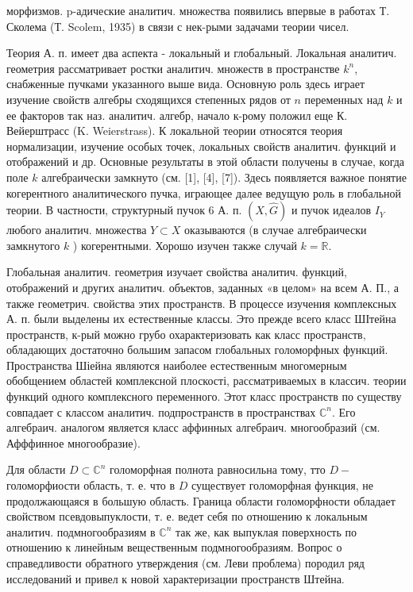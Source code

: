 \documentclass[10pt]{article}
\begin{document}
морфизмов. p-адические аналитич. множества появились впервые в работах Т. Сколема (Т. Scolem, 1935) в связи с нек-рыми задачами теории чисел.



Теория А. п. имеет два аспекта - локальный и глобальный. Локальная аналитич. геометрия рассматривает ростки аналитич. множеств в пространстве $k^{n}$, снабженные пучками указанного выше вида. Основную роль здесь играет изучение свойств алгебры сходящихся степенных рядов от $n$ переменных над $k$ и ее факторов так наз. аналитич. алгебр, начало к-рому положил еще К. Вейерштрасс (K. Weierstrass). К локальной теории относятся теория нормализации, изучение особых точек, локальных свойств аналитич. функций и отображений и др. Основные результаты в этой области получены в случае, когда поле $k$ алгебраически замкнуто (см. [1], [4], [7]). Здесь появляется важное понятие когерентного аналитического пучка, играющее далее ведущую роль в глобальной теории. В частности, структурный пучок 6 А. п. $(X, \widehat{G})$ и пучок идеалов $I_{Y}$ любого аналитич. множества $Y \subset X$ оказываются (в случае алгебраически замкнутого $k$ ) когерентными. Хорошо изучен также случай $k=\mathbb{R}$.



Глобальная аналитич. геометрия изучает свойства аналитич. функций, отображений и других аналитич. объектов, заданных «в целом» на всем А. П., а также геометрич. свойства этих пространств. В процессе изучения комплексных А. п. были выделены их естественные классы. Это прежде всего класс ШІтейна пространств, к-рый можно грубо охарактеризовать как класс пространств, обладающих достаточно большим запасом глобальных голоморфных функций. Пространства Шіейна являются наиболее естественным многомерным обобщением областей комплексной плоскості, рассматриваемых в классич. теории функций одного комплексного переменного. Этот класс пространств по существу совпадает с классом аналитич. подпространств в пространствах $\mathbb{C}^{n}$. Его алгебраич. аналогом является класс аффинных алгебраич. многообразий (см. Афффинное многообразие).



Для области $D \subset \mathbb{C}^{n}$ голоморфная полнота равносильна тому, тто $D-$ голоморфиости область, т. е. что в $D$ существует голоморфная функция, не продолжающаяся в большую область. Граница области голоморфности обладает свойством псевдовыпуклости, т. е. ведет себя по отношению к локальным аналитич. подмногообразиям в $\mathbb{C}^{n}$ так же, как выпуклая поверхность по отношению к линейным вещественным подмногообразиям. Вопрос о справедливости обратного утверждения (см. Леви проблема) породил ряд исследований и привел к новой характеризации пространств Штейна.
\end{document}
